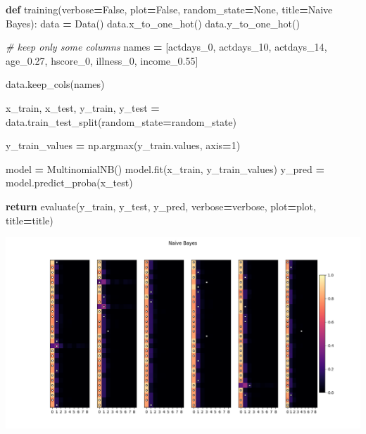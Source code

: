 \documentclass[
]{article}
\newenvironment{Shaded}{\begin{snugshade}}{\end{snugshade}}
\newcommand{\CommentTok}[1]{\textcolor[rgb]{0.56,0.35,0.01}{\textit{#1}}}
\newcommand{\ControlFlowTok}[1]{\textcolor[rgb]{0.13,0.29,0.53}{\textbf{#1}}}
\newcommand{\DecValTok}[1]{\textcolor[rgb]{0.00,0.00,0.81}{#1}}
\newcommand{\KeywordTok}[1]{\textcolor[rgb]{0.13,0.29,0.53}{\textbf{#1}}}
\newcommand{\NormalTok}[1]{#1}
\newcommand{\OperatorTok}[1]{\textcolor[rgb]{0.81,0.36,0.00}{\textbf{#1}}}
\newcommand{\StringTok}[1]{\textcolor[rgb]{0.31,0.60,0.02}{#1}}
\newcommand{\VariableTok}[1]{\textcolor[rgb]{0.00,0.00,0.00}{#1}}
\begin{document}
\begin{Shaded}
\begin{Highlighting}[]

\KeywordTok{def}\NormalTok{ training(verbose}\OperatorTok{=}\VariableTok{False}\NormalTok{, plot}\OperatorTok{=}\VariableTok{False}\NormalTok{, random\_state}\OperatorTok{=}\VariableTok{None}\NormalTok{, title}\OperatorTok{=}\StringTok{\textquotesingle{}Naive Bayes\textquotesingle{}}\NormalTok{):}
\NormalTok{    data }\OperatorTok{=}\NormalTok{ Data()}
\NormalTok{    data.x\_to\_one\_hot()}
\NormalTok{    data.y\_to\_one\_hot()}

    \CommentTok{\# keep only some columns}
\NormalTok{    names }\OperatorTok{=}\NormalTok{ [}\StringTok{\textquotesingle{}actdays\_0\textquotesingle{}}\NormalTok{, }\StringTok{\textquotesingle{}actdays\_10\textquotesingle{}}\NormalTok{, }\StringTok{\textquotesingle{}actdays\_14\textquotesingle{}}\NormalTok{, }\StringTok{\textquotesingle{}age\_0.27\textquotesingle{}}\NormalTok{,}
             \StringTok{\textquotesingle{}hscore\_0\textquotesingle{}}\NormalTok{, }\StringTok{\textquotesingle{}illness\_0\textquotesingle{}}\NormalTok{, }\StringTok{\textquotesingle{}income\_0.55\textquotesingle{}}\NormalTok{]}

\NormalTok{    data.keep\_cols(names)}

\NormalTok{    x\_train, x\_test, y\_train, y\_test }\OperatorTok{=}\NormalTok{ data.train\_test\_split(random\_state}\OperatorTok{=}\NormalTok{random\_state)}

\NormalTok{    y\_train\_values }\OperatorTok{=}\NormalTok{ np.argmax(y\_train.values, axis}\OperatorTok{=}\DecValTok{1}\NormalTok{)}

\NormalTok{    model }\OperatorTok{=}\NormalTok{ MultinomialNB()}
\NormalTok{    model.fit(x\_train, y\_train\_values)}
\NormalTok{    y\_pred }\OperatorTok{=}\NormalTok{ model.predict\_proba(x\_test)}

    \ControlFlowTok{return}\NormalTok{ evaluate(y\_train, y\_test, y\_pred, verbose}\OperatorTok{=}\NormalTok{verbose, plot}\OperatorTok{=}\NormalTok{plot, title}\OperatorTok{=}\NormalTok{title)}
\end{Highlighting}
\end{Shaded}

\includegraphics{naive_bayes.png}
\end{document}
